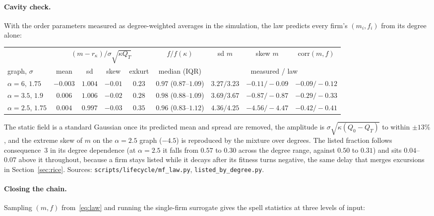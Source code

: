 \documentclass[11pt]{article}
\theoremstyle{remark}
\begin{document}
\paragraph{Cavity check.}  With the order parameters measured as degree-weighted averages in the simulation, the
law predicts every firm's $(m_i,f_i)$ from its degree alone:

\begin{center}
\footnotesize\setlength{\tabcolsep}{3pt}
\begin{tabular}{l|cccc|c|ccc}
\toprule
 & \multicolumn{4}{c|}{$(m-r_\kappa)/\sigma\sqrt{\kappa Q_T}$} & $f/f(\kappa)$ & sd $m$ & skew $m$ & corr$(m,f)$\\
graph, $\sigma$ & mean & sd & skew & exkurt & median (IQR) & \multicolumn{3}{c}{measured / law}\\
\midrule
$\alpha=6$, $1.75$   & $-0.003$ & $1.004$ & $-0.01$ & $0.23$ & $0.97$ ($0.87$--$1.09$) & $3.27/3.23$ & $-0.11/-0.09$ & $-0.09/-0.12$\\
$\alpha=3.5$, $1.9$  & $0.006$  & $1.006$ & $-0.02$ & $0.28$ & $0.98$ ($0.88$--$1.09$) & $3.69/3.67$ & $-0.87/-0.87$ & $-0.29/-0.33$\\
$\alpha=2.5$, $1.75$ & $0.004$  & $0.997$ & $-0.03$ & $0.35$ & $0.96$ ($0.83$--$1.12$) & $4.36/4.25$ & $-4.56/-4.47$ & $-0.42/-0.41$\\
\bottomrule
\end{tabular}
\end{center}

The static field is a standard Gaussian once its predicted mean and spread are removed, the amplitude is
$\sigma\sqrt{\kappa(Q_0-Q_T)}$ to within $\pm13\%$, and the extreme skew of $m$ on the $\alpha=2.5$ graph ($-4.5$) is
reproduced by the mixture over degrees.  The listed fraction follows consequence~3 in its degree dependence (at
$\alpha=2.5$ it falls from $0.57$ to $0.30$ across the degree range, against $0.50$ to $0.31$) and sits
$0.04$--$0.07$ above it throughout, because a firm stays listed while it decays after its fitness turns negative,
the same delay that merges excursions in Section~\ref{sec:rice}.  Sources: \texttt{scripts/lifecycle/mf\_law.py},
\texttt{listed\_by\_degree.py}.

\paragraph{Closing the chain.}  Sampling $(m,f)$ from~\eqref{eq:law} and running the single-firm surrogate gives
the spell statistics at three levels of input:
\end{document}
